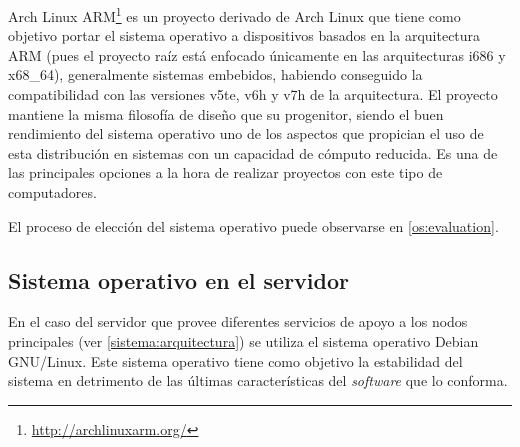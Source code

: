 Arch Linux ARM\footnote{\href{http://archlinuxarm.org/}{http://archlinuxarm.org/}} es un proyecto derivado de Arch Linux que tiene como objetivo portar el sistema operativo a dispositivos basados en la arquitectura ARM (pues el proyecto raíz está enfocado únicamente en las arquitecturas i686 y x68\_64), generalmente sistemas embebidos, habiendo conseguido la compatibilidad con las versiones v5te, v6h y v7h de la arquitectura. El proyecto mantiene la misma filosofía de diseño que su progenitor, siendo el buen rendimiento del sistema operativo uno de los aspectos que propician el uso de esta distribución en sistemas con un capacidad de cómputo reducida. Es una de las principales opciones a la hora de realizar proyectos con este tipo de computadores\cite{distrowatch:arm}.%






El proceso de elección del sistema operativo puede observarse en \ref{os:evaluation}.


\subsection{Sistema operativo en el servidor}

En el caso del servidor que provee diferentes servicios de apoyo a los nodos principales (ver \ref{sistema:arquitectura}) se utiliza el sistema operativo Debian GNU/Linux. Este sistema operativo tiene como objetivo la estabilidad del sistema en detrimento de las últimas características del \textit{software} que lo conforma.

